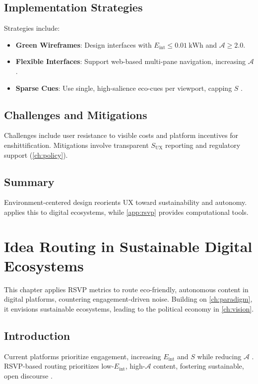 \documentclass[openany]{book}
\newcommand{\Sent}{S} %
\newcommand{\Eint}{E_{\mathrm{int}}} %
\newcommand{\Auton}{\mathcal{A}} %
\newcommand{\SUX}{S_{\mathrm{UX}}} %
\newcommand{\kWh}{\mathrm{kWh}}
\begin{document}
\section{Implementation Strategies}
\label{sec:paradigm-strategies}
Strategies include:
\begin{itemize}
  \item \textbf{Green Wireframes}: Design interfaces with $\Eint \leq \SI{0.01}{\kWh}$ and $\Auton \geq 2.0$.
  \item \textbf{Flexible Interfaces}: Support web-based multi-pane navigation, increasing $\Auton$.
  \item \textbf{Sparse Cues}: Use single, high-salience eco-cues per viewport, capping $\Sent$ \citep{colak2024}.
\end{itemize}

\section{Challenges and Mitigations}
\label{sec:paradigm-challenges}
Challenges include user resistance to visible costs and platform incentives for enshittification. Mitigations involve transparent $\SUX$ reporting and regulatory support (\cref{ch:policy}).

\section{Summary}
Environment-centered design reorients UX toward sustainability and autonomy.  applies this to digital ecosystems, while \cref{app:rsvp} provides computational tools.

\chapter{Idea Routing in Sustainable Digital Ecosystems}
\label{ch:routing}

This chapter applies RSVP metrics to route eco-friendly, autonomous content in digital platforms, countering engagement-driven noise. Building on \cref{ch:paradigm}, it envisions sustainable ecosystems, leading to the political economy in \cref{ch:vision}.

\section{Introduction}
\label{sec:routing-intro}
Current platforms prioritize engagement, increasing $\Eint$ and $\Sent$ while reducing $\Auton$ \citep{doctorow2022}. RSVP-based routing prioritizes low-$\Eint$, high-$\Auton$ content, fostering sustainable, open discourse \citep{designlab2024}.
\end{document}
